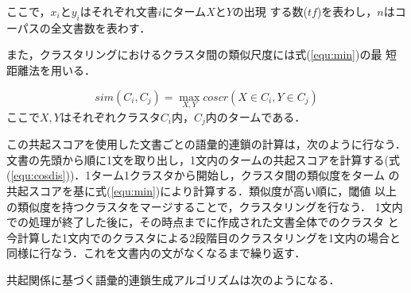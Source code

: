 \noindent ここで，$x_{i}$と$y_{i}$はそれぞれ文書$i$にターム$X$と$Y$の出現
する数($tf$)を表わし，$n$はコーパスの全文書数を表わす．

また，クラスタリングにおけるクラスタ間の類似尺度には式(\ref{equ:min})の最
短距離法を用いる．

\begin{equation}\label{equ:min}
sim(C_i,C_j)=\max_{X,Y} coscr(X\in C_i, Y\in C_j)
\end{equation}
\noindent ここで$X,Y$はそれぞれクラスタ$C_i$内，$C_j$内のタームである．

この共起スコアを使用した文書ごとの語彙的連鎖の計算は，次のように行なう．
文書の先頭から順に1文を取り出し，1文内のタームの共起スコアを計算する(式
(\ref{equ:cosdis}))．1ターム1クラスタから開始し，クラスタ間の類似度をターム
の共起スコアを基に式(\ref{equ:min})により計算する．類似度が高い順に，閾値
以上の類似度を持つクラスタをマージすることで，クラスタリングを行なう．
1文内での処理が終了した後に，その時点までに作成された文書全体でのクラスタ
と今計算した1文内でのクラスタによる2段階目のクラスタリングを1文内の場合と
同様に行なう．これを文書内の文がなくなるまで繰り返す．

共起関係に基づく語彙的連鎖生成アルゴリズムは次のようになる．

